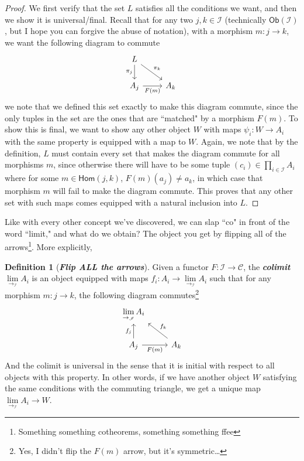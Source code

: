 \documentclass[psamsfonts]{amsart}
\theoremstyle{definition}
\newtheorem{defn}[thm]{Definition}
\theoremstyle{remark}
\renewcommand{\hom}{\mathsf{Hom}}
\newcommand{\ib}[1]{\textbf{\textit{#1}}}
\begin{document}
%
\begin{proof}
We first verify that the set $L$ satisfies all the conditions we want, and then we show it is universal/final. Recall that for any two $j,k \in \mathscr{I}$ (technically $\mathsf{Ob}(\mathscr{I})$, but I hope you can forgive the abuse of notation), with a morphism $m : j \to k$, we want the following diagram to commute
$$\begin{tikzcd}
L \arrow[d, "\pi_j"'] \arrow[dr, "\pi_k"] \\
A_j \arrow[r, "F(m)"'] & A_k
\end{tikzcd}$$
we note that we defined this set exactly to make this diagram commute, since the only tuples in the set are the ones that are ``matched" by a morphism $F(m)$. To show this is final, we want to show any other object $W$ with maps $\psi_i : W \to A_i$ with the same property is equipped with a map to $W$. Again, we note that by the definition, $L$ must contain every set that makes the diagram commute for all morphisms $m$, since otherwise there will have to be some tuple $(c_i) \in \prod_{i \in \mathscr{I}} A_i$ where for some $m \in \hom(j,k)$, $F(m)(a_j) \neq a_k$, in which case that morphism $m$ will fail to make the diagram commute. This proves that any other set with such maps comes equipped with a natural inclusion into $L$.
\end{proof}
%
Like with every other concept we've discovered, we can slap ``co" in front of the word ``limit," and what do we obtain? The object you get by flipping all of the arrows\footnote{Something something cotheorems, something something ffee}. More explicitly,
%
\begin{defn}[\ib{Flip ALL the arrows}]
Given a functor $F : \mathscr{I} \to \mathscr{C}$, the \ib{colimit} $\lim\limits_{\to_\mathscr{I}}A_i$ is an object equipped with maps $f_i : A_i \to \lim\limits_{\to_\mathscr{I}}A_i$ such that for any morphism $m : j \to k$, the following diagram commutes\footnote{Yes, I didn't flip the $F(m)$ arrow, but it's symmetric\ldots}
$$\begin{tikzcd}
\lim\limits_{\to_\mathscr{I}} A_i \\
A_j \arrow[u, "f_j"]\arrow[r, "F(m)"'] & A_k \arrow[ul, "f_k"']
\end{tikzcd}$$
And the colimit is universal in the sense that it is initial with respect to all objects with this property. In other words, if we have another object $W$ satisfying the same conditions with the commuting triangle, we get a unique map $\lim\limits_{\to_{\mathscr{I}}}A_i \to W$.
\end{defn}
\end{document}
